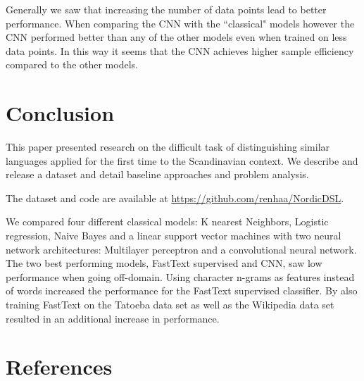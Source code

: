 \documentclass[11pt,a4paper]{article}
\begin{document}
Generally we saw that increasing the number of data points lead to better performance. When comparing the CNN with the ``classical" models however the CNN performed better than any of the other models even when trained on less data points. In this way it seems that the CNN achieves higher sample efficiency compared to the other models.
 \section{Conclusion}
This paper presented research on the difficult task of distinguishing similar languages applied for the first time to the Scandinavian context. We describe and release a dataset and detail baseline approaches and problem analysis. 

The dataset and code are available at \url{https://github.com/renhaa/NordicDSL}.

We compared four different classical models: K nearest Neighbors, Logistic regression, Naive Bayes and a linear support vector machines with two neural network architectures: Multilayer perceptron and a convolutional neural network. The two best performing models, FastText supervised and CNN, saw low performance when going off-domain. Using character n-grams as features instead of words increased the performance for the FastText supervised classifier. By also training FastText on the Tatoeba data set as well as the Wikipedia data set resulted in an additional increase in performance.



 


\section{References}
\label{main:ref}



\end{document}
